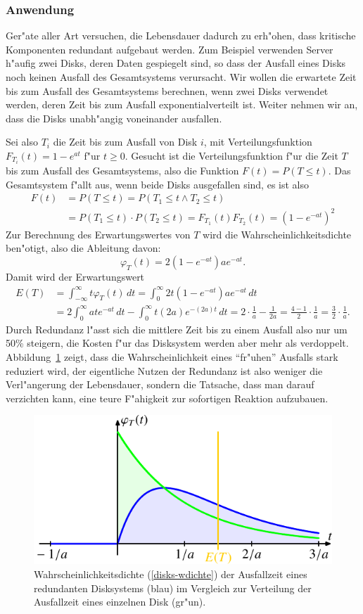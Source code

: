 \subsubsection{Anwendung}
Ger"ate aller Art versuchen, die Lebensdauer dadurch zu erh"ohen, dass
kritische Komponenten redundant aufgebaut werden.
Zum Beispiel verwenden Server h"aufig zwei Disks, deren Daten
gespiegelt sind, so dass der Ausfall eines Disks noch keinen Ausfall
des Gesamtsystems verursacht. Wir wollen die erwartete Zeit bis zum
Ausfall des Gesamtsystems berechnen, wenn zwei Disks verwendet werden,
deren Zeit bis zum Ausfall exponentialverteilt ist. Weiter nehmen
wir an, dass die Disks unabh"angig voneinander ausfallen.

Sei also $T_i$ die Zeit bis zum Ausfall von Disk $i$, mit
Verteilungsfunktion $F_{T_i}(t)=1-e^{at}$ f"ur $t\ge 0$. Gesucht
ist die Verteilungsfunktion f"ur die Zeit $T$ bis zum Ausfall
des Gesamtsystems, also die Funktion $F(t)=P(T\le t)$. Das Gesamtsystem
f"allt aus, wenn beide Disks ausgefallen sind, es ist also
\begin{align*}
F(t)
&=P(T\le t)=P(T_1\le t\wedge T_2\le t)\\
&=P(T_1\le t)\cdot P(T_2\le t)
= F_{T_1}(t) F_{T_2}(t)=(1-e^{-at})^2
\end{align*}
Zur Berechnung des Erwartungswertes von $T$ wird die
Wahrscheinlichkeitsdichte ben"otigt, also die Ableitung davon:
\begin{equation}
\varphi_{T}(t)=2(1-e^{-at})ae^{-at}.
\label{disks-wdichte}
\end{equation}
Damit wird der Erwartungswert
\begin{align*}
E(T)
&=
\int_{-\infty}^{\infty}t\varphi_T(t)\,dt
=\int_0^\infty 2t(1-e^{-at})ae^{-at}\,dt
\\
&=2\int_0^\infty ate^{-at}\,dt - \int_0^\infty t (2a)e^{-(2a)t}\,dt
=2\cdot\frac1a-\frac1{2a}=\frac{4-1}2\cdot\frac1a=\frac32\cdot\frac1a.
\end{align*}
Durch Redundanz l"asst sich die mittlere Zeit bis zu einem Ausfall
also nur um 50\% steigern, die Kosten f"ur das Disksystem werden
aber mehr als verdoppelt.
Abbildung~\ref{graph:disksystem} zeigt, dass die Wahrscheinlichkeit
eines ``fr"uhen'' Ausfalls stark reduziert wird, der eigentliche
Nutzen der Redundanz ist also weniger die Verl"angerung der 
Lebensdauer, sondern die Tatsache, dass man darauf verzichten kann,
eine teure F"ahigkeit zur sofortigen Reaktion aufzubauen.
\begin{figure}
\centering
\includegraphics{images/exp-3.pdf}
\caption{Wahrscheinlichkeitsdichte (\ref{disks-wdichte}) 
der Ausfallzeit eines redundanten Disksystems (blau)
im Vergleich zur Verteilung der Ausfallzeit eines einzelnen Disk (gr"un).
\label{graph:disksystem}}
\end{figure}

